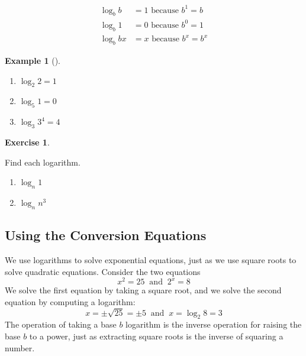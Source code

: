 \documentclass[10pt,]{book}
\theoremstyle{plain}
\theoremstyle{definition}
\theoremstyle{definition}
\theoremstyle{definition}
\newtheorem{example}[theorem]{Example}
\theoremstyle{definition}
\theoremstyle{definition}
\newtheorem{exercise}[theorem]{Exercise}
\numberwithin{equation}{section}
\newcommand{\amp}{ & }
\begin{document}
	\begin{align*}
	\log_b b \amp = 1 \text{ because } b^1 = b \\
	\log_b 1 \amp = 0  \text{ because } b^0 = 1 \\
	\log_b{bx} \amp = x \text{ because } b^x = b^x
	\end{align*}
%
\begin{example}[]\label{example-useful-logarithms}
\leavevmode%
\begin{enumerate}[label=*\alph**]
\item\hypertarget{li-693}{}\(\log_{2}{2} = 1\)\item\hypertarget{li-694}{}\(\log_{5}{1} = 0\)\item\hypertarget{li-695}{}\(\log_{3}{3^4} = 4\)\end{enumerate}
\end{example}
\begin{exercise}\label{exercise-useful-logarithms}

	Find each logarithm.
	\leavevmode%
\begin{enumerate}[label=*\alph**]
\item\hypertarget{li-696}{}\(\log_{n}{1}\)\item\hypertarget{li-697}{}\(\log_{n}{n^3}\)\end{enumerate}
\end{exercise}
\typeout{************************************************}
\typeout{************************************************}
\subsection[Using the Conversion Equations]{Using the Conversion Equations}\label{subsection-96}

	We use logarithms to solve exponential equations, just as we use square roots to solve quadratic equations. Consider the two equations
	\begin{equation*}x^2 = 25 ~ \text{ and } ~ 2^x = 8\end{equation*}
	We solve the first equation by taking a square root, and we solve the second equation by computing a logarithm:
	\begin{equation*}x = \pm\sqrt{25} = \pm 5 ~ \text{ and } ~ x = \log_{2}{8} = 3\end{equation*}
	The operation of taking a base \(b\) logarithm is the inverse operation for raising the base \(b\) to a power, just as extracting square roots is the inverse of squaring a number.
%
\par
\end{document}
